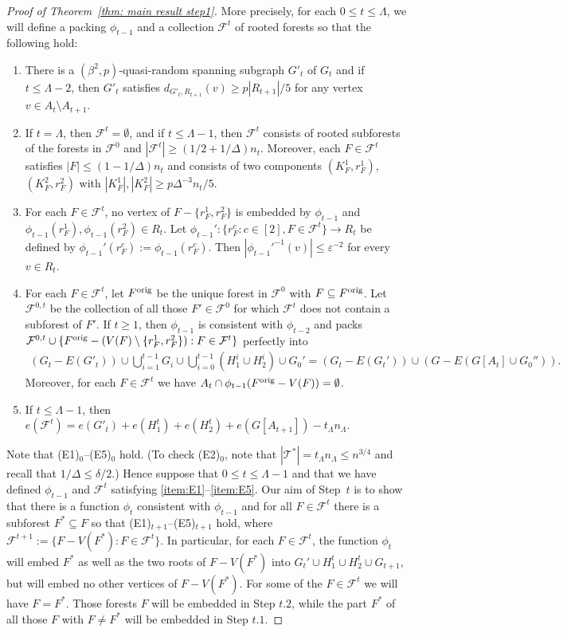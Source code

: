 \documentclass[a4paper, 11pt, reqno]{amsart}
\numberwithin{equation}{section}
\newcommand{\1}{{\rm 1\hspace*{-0.4ex}%
\rule{0.1ex}{1.52ex}\hspace*{0.2ex}}}
\newcommand{\es}{\emptyset}
\newcommand{\cF}{\mathcal{F}}
\newcommand{\cT}{\mathcal{T}}
\newcommand{\ori}{{\rm orig}}
\renewcommand{\epsilon}{\varepsilon}
\newcommand{\sm}{\setminus}
\newcommand{\sub}{\subseteq}
\newcounter{step}
\begin{document}
\begin{proof}[Proof of Theorem~\ref{thm: main result step1}]
More precisely,
for each $0\leq t\leq \Lambda$,
we will define a packing $\phi_{t-1}$
and a collection $\cF^t$ of rooted forests  
so that the following hold:
\begin{enumerate}[label=(E\arabic*)$_t$]
	\item\label{item:E1} There is a $(\beta^2,p)$-quasi-random spanning subgraph $G'_t$ of $G_t$ 
	and if $t\leq \Lambda-2$, then $G'_t$
	satisfies $d_{G'_t,R_{t+1}}(v) \geq p|R_{t+1}|/5$ for any vertex $v\in A_{t}\setminus A_{t+1}$.
	\item\label{item:E2} If $t=\Lambda$, then $\cF^{t}=\es$,
	and if $t\leq \Lambda-1$, 
	then $\cF^{t}$ consists of rooted subforests of the forests in $\cF^0$ and $|\cF^t|\geq (1/2+1/\Delta)n_t$.
	Moreover, each $F\in \cF^t$ satisfies $|F|\leq (1-1/\Delta)n_t$ and consists of two components $(K_F^1,r_F^1)$, $(K_F^2,r_F^2)$
	with $|K_F^1|,|K_F^2|\geq p\Delta^{-3}n_t/5$.	
	\item\label{item:E3} For each $F\in \cF^t$, no vertex of $F-\{r_F^1,r_F^2\}$ is embedded by $\phi_{t-1}$
	and $\phi_{t-1}(r_F^1),\phi_{t-1}(r_F^2)\in R_t$.
	Let $\phi_{t-1}':\{r_F^c:c\in [2],F\in \cF^t\}\to R_t$ be defined by $\phi_{t-1}'(r_F^c):=\phi_{t-1}(r_F^c)$.
	Then $|\phi_{t-1}'^{-1}(v)|\leq \epsilon^{-2}$ for every $v\in R_{t}$.	
	\item\label{item:E4} For each $F\in \cF^t$, 
	let $F^\ori$ be the unique forest in $\cF^0$ with $F\sub F^\ori$.
	Let $\cF^{0,t}$ be the collection of all those $F'\in \cF^0$ for which $\cF^t$
	does not contain a subforest of $F'$.
	If $t\geq 1$,
	then $\phi_{t-1}$ is consistent with $\phi_{t-2}$
	and packs $\cF^{0,t}\cup \{F^\ori-(V(F)\sm \{r_F^1,r_F^2\}):F\in \cF^t\}$ perfectly into
	\begin{align*}
		(G_t-E(G'_t))\cup \bigcup_{i=1}^{t-1} G_i \cup \bigcup_{i=0}^{t-1} (H_1^i\cup H_2^i)\cup G_0'
		= (G_t-E(G_t'))\cup (G-E(G[A_t]\cup G_0'')).
	\end{align*}
	Moreover, for each $F\in \cF^t$ we have $A_t\cap \phi_{t-1}(F^{\ori}-V(F))=\es$.
	\item\label{item:E5} If $t\leq \Lambda-1$, then 
	$e(\cF^t)= e(G'_t)+ e(H^t_1) + e(H^t_2) + e(G[A_{t+1}]) - t_{\Lambda}n_{\Lambda}$.
\end{enumerate}
Note that (E1)$_0$--(E5)$_0$ hold. 
(To check (E2)$_0$,
note that $|\cT^*|=t_{\Lambda}n_{\Lambda}\leq n^{3/4}$ and recall that $1/\Delta\leq \delta/2$.)
Hence suppose that $0\leq t\leq \Lambda-1$ and that we have defined $\phi_{t-1}$ and $\cF^t$ satisfying \ref{item:E1}--\ref{item:E5}.
Our aim of Step~$t$ is to show that there is a function $\phi_t$ consistent with $\phi_{t-1}$  and for all $F\in \cF^t$
there is a subforest $F^*\sub F$ so that  
(E1)$_{t+1}$--(E5)$_{t+1}$ hold,
where $\cF^{t+1}:=\{F-V(F^*):F\in \cF^t\}$.
In particular,
for each $F\in \cF^t$,
the function $\phi_t$ will embed $F^*$ as well as the two roots of $F-V(F^*)$ into $G_t'\cup H_1^t\cup H_2^t\cup G_{t+1}$,
but will embed no other vertices of $F-V(F^*)$.
For some of the $F\in \cF^t$ we will have $F=F^*$.
Those forests $F$ will be embedded in Step $t.2$,
while the part $F^*$ of all those $F$ with $F\neq F^*$ will be embedded in Step $t.1$.


\end{proof}
\end{document}
